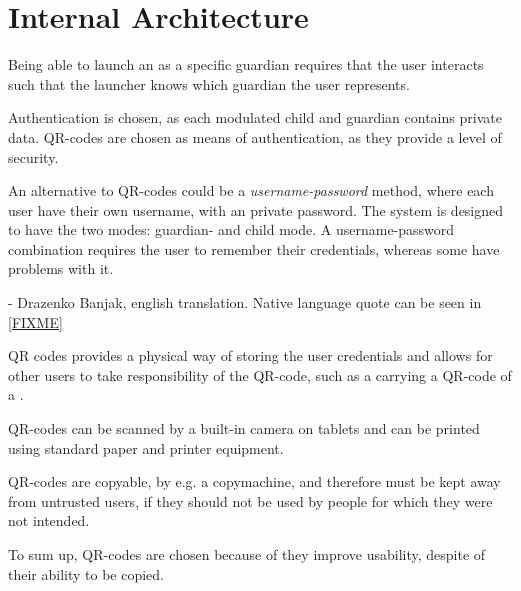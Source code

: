 \section{Internal Architecture}

Being able to launch an \girafapp[] as a specific guardian requires that the user interacts such that the launcher knows which guardian the user represents.

Authentication is chosen, as each modulated child and guardian contains private data. QR-codes are chosen as means of authentication, as they provide a level of security.

An alternative to QR-codes could be a \emph{username-password} method, where each user have their own username, with an private password. The system is designed to have the two modes: guardian- and child mode. A username-password combination requires the user to remember their credentials, whereas some \autists[] have problems with it. 

 - Drazenko Banjak, english translation. Native language quote can be seen in \autoref{FIXME}

QR codes provides a physical way of storing the user credentials and allows for other users to take responsibility of the QR-code, such as a \guardian[] carrying a QR-code of a \autist[].

QR-codes can be scanned by a built-in camera on tablets and can be printed using standard paper and printer equipment. 

QR-codes are copyable, by e.g. a copymachine, and therefore must be kept away from untrusted users, if they should not be used by people for which they were not intended.

To sum up, QR-codes are chosen because of they improve usability, despite of their ability to be copied.


